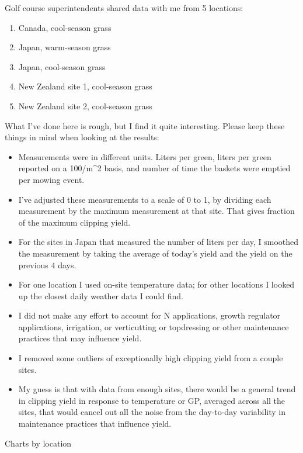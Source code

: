 \documentclass[12pt,b5,]{tufte-book}
\providecommand{\tightlist}{%
  \setlength{\itemsep}{0pt}\setlength{\parskip}{0pt}}
\begin{document}
Golf course superintendents shared data with me from 5 locations:

\begin{enumerate}
\def\labelenumi{\arabic{enumi}.}
\tightlist
\item
  Canada, cool-season grass
\item
  Japan, warm-season grass
\item
  Japan, cool-season grass
\item
  New Zealand site 1, cool-season grass
\item
  New Zealand site 2, cool-season grass
\end{enumerate}

What I've done here is rough, but I find it quite interesting. Please keep these things in mind when looking at the results:

\begin{itemize}
\tightlist
\item
  Measurements were in different units. Liters per green, liters per green reported on a 100/m\^{}2 basis, and number of time the baskets were emptied per mowing event.
\item
  I've adjusted these measurements to a scale of 0 to 1, by dividing each measurement by the maximum measurement at that site. That gives fraction of the maximum clipping yield.
\item
  For the sites in Japan that measured the number of liters per day, I smoothed the measurement by taking the average of today's yield and the yield on the previous 4 days.
\item
  For one location I used on-site temperature data; for other locations I looked up the closest daily weather data I could find.
\item
  I did not make any effort to account for N applications, growth regulator applications, irrigation, or verticutting or topdressing or other maintenance practices that may influence yield.
\item
  I removed some outliers of exceptionally high clipping yield from a couple sites.
\item
  My guess is that with data from enough sites, there would be a general trend in clipping yield in response to temperature or GP, averaged across all the sites, that would cancel out all the noise from the day-to-day variability in maintenance practices that influence yield.
\end{itemize}

Charts by location
\end{document}
